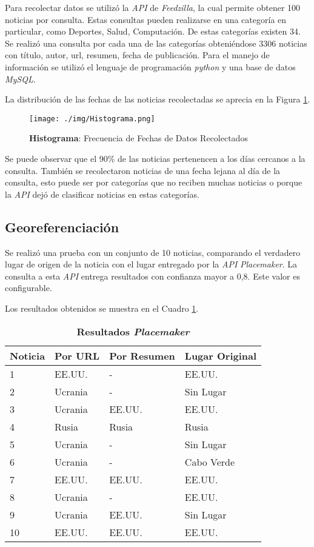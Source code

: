 \documentclass[10pt]{article}
\begin{document}
Para recolectar datos se utilizó la \emph{API} de \emph{Feedzilla}, la cual permite obtener 100 noticias por consulta. Estas consultas pueden realizarse en una categoría en particular, como Deportes, Salud, Computación. De estas categorías existen 34. Se realizó una consulta por cada una de las categorías obteniéndose 3306 noticias con título, autor, url, resumen, fecha de publicación. Para el manejo de información se utilizó el lenguaje de programación \emph{python} y una base de datos \emph{MySQL}.

La distribución de las fechas de las noticias recolectadas se aprecia en la Figura \ref{histograma}.

\begin{figure}[h!]
	\centering
    \texttt{[image: ./img/Histograma.png]}
	\caption{\textbf{Histograma}: Frecuencia de Fechas de Datos Recolectados}
	\label{histograma}
\end{figure}

Se puede observar que el 90\% de las noticias pertenencen a los días cercanos a la consulta. También se recolectaron noticias de una fecha lejana al día de la consulta, esto puede ser por categorías que no reciben muchas noticias o porque la \emph{API} dejó de clasificar noticias en estas categorías.

\subsection{Georeferenciación}

Se realizó una prueba con un conjunto de 10 noticias, comparando el verdadero lugar de origen de la noticia con el lugar entregado por la \emph{API} \emph{Placemaker}. La consulta a esta \emph{API} entrega resultados con confianza mayor a 0,8. Este valor es configurable. 

Los resultados obtenidos se muestra en el Cuadro \ref{placemaker}.

\begin{table}\footnotesize
	\begin{center}
	\begin{tabular}{|l|l|l|l|}
	\hline
	Noticia & Por URL & Por Resumen & Lugar Original\\
	\hline
	\hline
	1 & EE.UU. & - & EE.UU.\\
	\hline
	2 & Ucrania & - & Sin Lugar\\
	\hline
	3 & Ucrania & EE.UU. & EE.UU.\\
	\hline
	4 & Rusia & Rusia & Rusia\\
	\hline
	5 & Ucrania & - & Sin Lugar\\
	\hline
	6 & Ucrania & - & Cabo Verde\\
	\hline
	7 & EE.UU. & EE.UU. & EE.UU.\\
	\hline
	8 & Ucrania & - & EE.UU.\\
	\hline
	9 & Ucrania & EE.UU. & Sin Lugar\\
	\hline
	10 & EE.UU. & EE.UU. & EE.UU.\\
	\hline
	\end{tabular}
	\caption{\textbf{Resultados \emph{Placemaker}}}
	\label{placemaker}
	\end{center}
\end{table}
\end{document}
